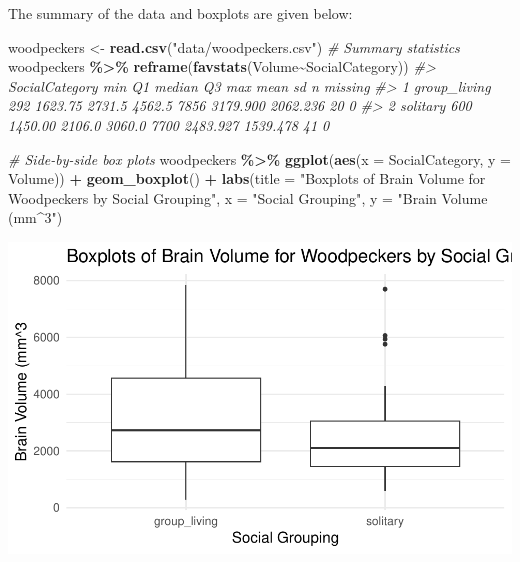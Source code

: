 \documentclass[
]{report}
\newenvironment{Shaded}{\begin{snugshade}}{\end{snugshade}}
\newcommand{\AttributeTok}[1]{\textcolor[rgb]{0.13,0.29,0.53}{#1}}
\newcommand{\CommentTok}[1]{\textcolor[rgb]{0.56,0.35,0.01}{\textit{#1}}}
\newcommand{\FunctionTok}[1]{\textcolor[rgb]{0.13,0.29,0.53}{\textbf{#1}}}
\newcommand{\NormalTok}[1]{#1}
\newcommand{\OtherTok}[1]{\textcolor[rgb]{0.56,0.35,0.01}{#1}}
\newcommand{\SpecialCharTok}[1]{\textcolor[rgb]{0.81,0.36,0.00}{\textbf{#1}}}
\newcommand{\StringTok}[1]{\textcolor[rgb]{0.31,0.60,0.02}{#1}}
\begin{document}
The summary of the data and boxplots are given below:

\begin{Shaded}
\begin{Highlighting}[]
\NormalTok{woodpeckers }\OtherTok{\textless{}{-}} \FunctionTok{read.csv}\NormalTok{(}\StringTok{"data/woodpeckers.csv"}\NormalTok{)}
\CommentTok{\# Summary statistics}
\NormalTok{woodpeckers }\SpecialCharTok{\%\textgreater{}\%} 
    \FunctionTok{reframe}\NormalTok{(}\FunctionTok{favstats}\NormalTok{(Volume}\SpecialCharTok{\textasciitilde{}}\NormalTok{SocialCategory))}
\CommentTok{\#\textgreater{}   SocialCategory min      Q1 median     Q3  max     mean       sd  n missing}
\CommentTok{\#\textgreater{} 1   group\_living 292 1623.75 2731.5 4562.5 7856 3179.900 2062.236 20       0}
\CommentTok{\#\textgreater{} 2       solitary 600 1450.00 2106.0 3060.0 7700 2483.927 1539.478 41       0}
\end{Highlighting}
\end{Shaded}

\begin{Shaded}
\begin{Highlighting}[]
\CommentTok{\# Side{-}by{-}side box plots}
\NormalTok{woodpeckers }\SpecialCharTok{\%\textgreater{}\%}
\FunctionTok{ggplot}\NormalTok{(}\FunctionTok{aes}\NormalTok{(}\AttributeTok{x =}\NormalTok{ SocialCategory, }\AttributeTok{y =}\NormalTok{ Volume)) }\SpecialCharTok{+}
    \FunctionTok{geom\_boxplot}\NormalTok{() }\SpecialCharTok{+} 
    \FunctionTok{labs}\NormalTok{(}\AttributeTok{title =} \StringTok{"Boxplots of Brain Volume for Woodpeckers by Social Grouping"}\NormalTok{,}
         \AttributeTok{x =} \StringTok{"Social Grouping"}\NormalTok{, }
         \AttributeTok{y =} \StringTok{"Brain Volume (mm\^{}3"}\NormalTok{) }
  
\end{Highlighting}
\end{Shaded}

\begin{center}\includegraphics[width=0.6\linewidth]{14-UR-module12_review_files/figure-latex/unnamed-chunk-2-1} \end{center}
\end{document}
